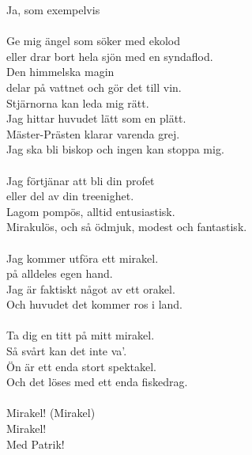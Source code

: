 \documentclass[a6paper, 10pt, twoside]{article}
\begin{document}
\begin{lyrics}
Ja, som exempelvis \\
\\
Ge mig ängel som söker med ekolod \\
eller drar bort hela sjön med en syndaflod. \\
Den himmelska magin \\
delar på vattnet och gör det till vin.\\
Stjärnorna kan leda mig rätt. \\
Jag hittar huvudet lätt som en plätt. \\
Mäster-Prästen klarar varenda grej. \\
Jag ska bli biskop och ingen kan stoppa mig. \\
\\
Jag förtjänar att bli din profet \\
eller del av din treenighet.\\
Lagom pompös, alltid entusiastisk. \\
Mirakulös, och så ödmjuk, modest och fantastisk. \\
\\
Jag kommer utföra ett mirakel. \\
på alldeles egen hand. \\
Jag är faktiskt något av ett orakel. \\
Och huvudet det kommer ros i land. \\
\\
Ta dig en titt på mitt mirakel. \\
Så svårt kan det inte va'.\\
Ön är ett enda stort spektakel. \\
Och det löses med ett enda fiskedrag. \\
\\
Mirakel! (Mirakel)\\
Mirakel! \\
Med Patrik!
\end{lyrics}

\end{document}
